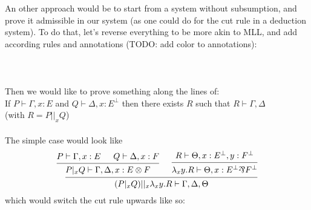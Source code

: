 \documentclass[a4paper,12pt]{book}
\begin{document}
\newpage

An other approach would be to start from a system without subsumption, and prove it admissible in our system (as one could do for the cut rule in a deduction system). To do that, let's reverse everything to be more akin to MLL, and add according rules and annotations (TODO: add color to annotations):\\~\\
\\~\\
Then we would like to prove something along the lines of:\\
If $P \vdash \Gamma,x:E$ and $Q \vdash \Delta,x:E^\bot$ then there exists $R$ such that $R \vdash \Gamma,\Delta$\\
(with $R=P||_xQ$)\\
~\\
The simple case would look like\\
\[\begin{prooftree}\hypo{P\vdash \Gamma,x:E}
			\hypo{Q \vdash \Delta,x:F}
		\infer2{P |_x Q \vdash \Gamma,\Delta,x:E \logtensor F}
			\hypo{R \vdash \Theta,x:E^\bot,y:F^\bot}
		\infer1{\lambda_xy.R \vdash \Theta,x:E^\bot \logpar F^\bot}
	\infer2{(P |_x Q) ||_x \lambda_xy.R \vdash \Gamma,\Delta,\Theta}\end{prooftree}\]
which would switch the cut rule upwards like so:\\
\end{document}

